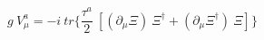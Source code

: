 \begin{equation}
g~V_\mu^a = -i~tr\{ \frac{\tau^a}{2} ~[(\partial_\mu \Xi)~\Xi^\dag + (\partial_\mu \Xi^\dag)~\Xi]\}
\end{equation}

